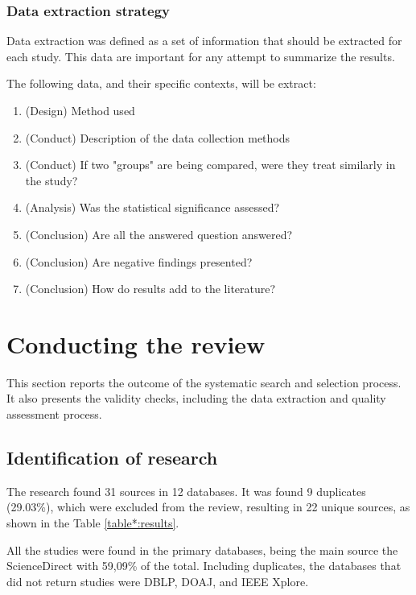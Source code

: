 \subsubsection{Data extraction strategy}

Data extraction was defined as a set of information that should be extracted for each study. This data are important for any attempt to summarize the results. 

The following data, and their specific contexts, will be extract:

\begin{enumerate}
    \item (Design) Method used
    \item(Conduct) Description of the data collection methods
    \item(Conduct) If two "groups" are being compared, were they treat similarly in the study?
    \item(Analysis) Was the statistical significance assessed?
    \item(Conclusion) Are all the answered question answered?
    \item(Conclusion) Are negative findings presented?
    \item(Conclusion) How do results add to the literature?
\end{enumerate}


\section{Conducting the review}
\label{section:Conducting}
This section reports the outcome of the systematic search and selection process. It also presents the validity checks, including the data extraction and quality assessment process.

\subsection{Identification of research}

The research found 31 sources in 12 databases. It was found 9 duplicates (29.03\%), which were excluded from the review, resulting in 22 unique sources, as shown in the Table \ref{table*:results}.



All the studies were found in the primary databases, being the main source the ScienceDirect with 59,09\% of the total. Including duplicates, the databases that did not return studies were \acrshort{DBLP}, \acrshort{DOAJ}, and IEEE Xplore. 

